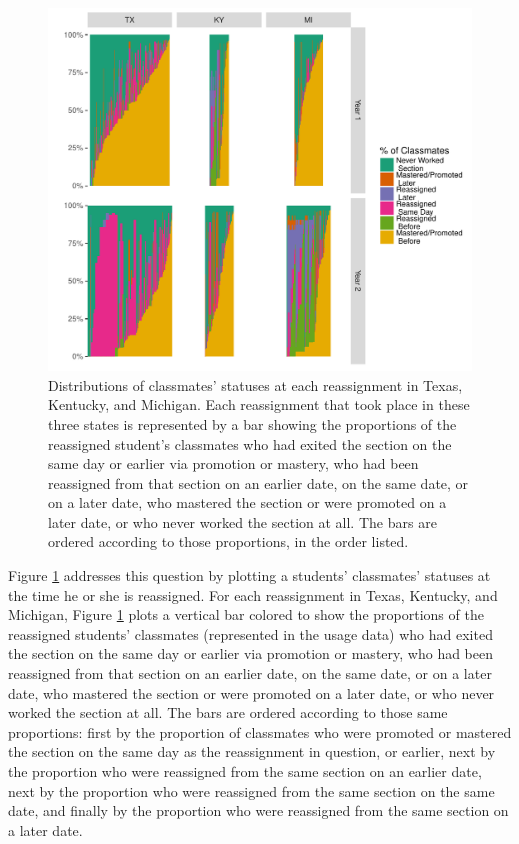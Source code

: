 \documentclass[12pt]{article}\usepackage[]{graphicx}\usepackage[]{color}
\makeatletter
\def\maxwidth{ %
  \ifdim\Gin@nat@width>\linewidth
    \linewidth
  \else
    \Gin@nat@width
  \fi
}
\makeatother
\begin{document}
\begin{figure}
  \centering


\includegraphics[width=\maxwidth]{figure/classmates-1} 

\caption{Distributions of classmates' statuses at each reassignment in
  Texas, Kentucky, and Michigan. Each reassignment that took place in
  these three states is represented by a bar showing the proportions of
  the reassigned student's classmates who had exited the section on
  the same day or earlier via promotion or mastery, who had been
  reassigned from that section on an earlier date, on the same date,
  or on a later date, who mastered the section or were promoted on a
  later date, or who never worked the section at all. The bars are
  ordered according to those proportions, in the order listed.}
\label{fig:classmates}
\end{figure}

Figure \ref{fig:classmates} addresses this question by plotting a
students' classmates' statuses at the time he or she is reassigned.
For each reassignment in Texas, Kentucky, and Michigan, Figure \ref{fig:classmates}
plots a vertical bar colored to show the proportions of the reassigned
students' classmates (represented in the usage data) who  had exited the section on
the same day or earlier via promotion or mastery, who had been
reassigned from that section on an earlier date, on the same date,
or on a later date, who mastered the section or were promoted on a
later date, or who never worked the section at all.
The bars are ordered according to those same proportions: first by the
proportion of classmates who were promoted or mastered the section on
the same day as the reassignment in question, or earlier, next by the
proportion who were reassigned from the same section on an earlier
date, next by the proportion who were reassigned from the same section
on the same date, and finally by the proportion who were reassigned
from the same section on a later date.
\end{document}
